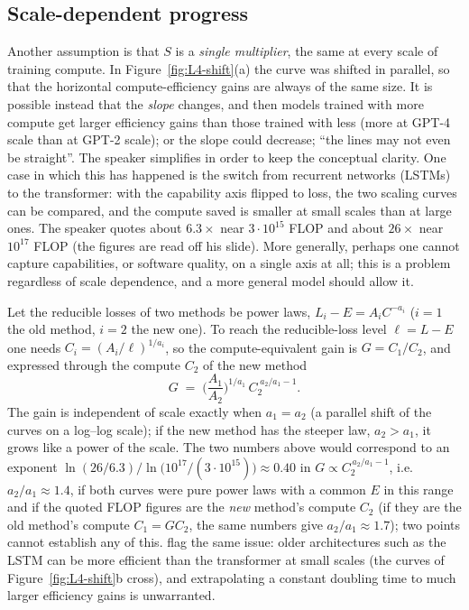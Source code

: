 \subsection{Scale-dependent progress}\label{sec:L4-scale}
Another assumption is that $S$ is a \emph{single multiplier}, the same at every scale of training compute. In Figure~\ref{fig:L4-shift}(a) the curve was shifted in parallel, so that the horizontal compute-efficiency gains are always of the same size. It is possible instead that the \emph{slope} changes, and then models trained with more compute get larger efficiency gains than those trained with less (more at GPT-4 scale than at GPT-2 scale); or the slope could decrease; ``the lines may not even be straight''. The speaker simplifies in order to keep the conceptual clarity.
One case in which this has happened is the switch from recurrent networks (LSTMs) to the transformer: with the capability axis flipped to loss, the two scaling curves can be compared, and the compute saved is smaller at small scales than at large ones. The speaker quotes about $6.3\times$ near $3\cdot10^{15}$ FLOP and about $26\times$ near $10^{17}$ FLOP\flag{} (the figures are read off his slide). More generally, perhaps one cannot capture capabilities, or software quality, on a single axis at all; this is a problem regardless of scale dependence, and a more general model should allow it.

\begin{beyond}
Let the reducible losses of two methods be power laws, $L_i-E=A_iC^{-a_i}$ ($i=1$ the old method, $i=2$ the new one). To reach the reducible-loss level $\ell=L-E$ one needs $C_i=(A_i/\ell)^{1/a_i}$, so the compute-equivalent gain is $G=C_1/C_2$, and expressed through the compute $C_2$ of the new method
\[
   G\;=\;\Big(\frac{A_1}{A_2}\Big)^{1/a_1}\,C_2^{\;a_2/a_1-1}.
\]
The gain is independent of scale exactly when $a_1=a_2$ (a parallel shift of the curves on a log--log scale); if the new method has the steeper law, $a_2>a_1$, it grows like a power of the scale. The two numbers above would correspond to an exponent $\ln(26/6.3)\big/\ln\!\big(10^{17}/(3\cdot10^{15})\big)\approx0.40$ in $G\propto C_2^{\,a_2/a_1-1}$, i.e.\ $a_2/a_1\approx1.4$, if both curves were pure power laws with a common $E$ in this range and if the quoted FLOP figures are the \emph{new} method's compute $C_2$ (if they are the old method's compute $C_1=GC_2$, the same numbers give $a_2/a_1\approx1.7$); two points cannot establish any of this. \citet{ho2024} flag the same issue: older architectures such as the LSTM can be more efficient than the transformer at small scales (the curves of Figure~\ref{fig:L4-shift}b cross), and extrapolating a constant doubling time to much larger efficiency gains is unwarranted.
\end{beyond}

